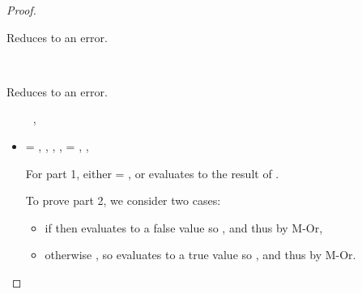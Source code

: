 \begin{lemma}
\begin{proof}
\begin{case}[BE-Assoc2]
  Reduces to an error.
\end{case}

\begin{case}[BE-Assoc3]
  \ 

  Reduces to an error.
\end{case}

\begin{case}[B-IfFalse]
        \opsem {\openv{}} {} {\false}
        \ \ \ \ 
        \opsem {\openv{}} {} {\nil},
        \opsem {\openv{}} {} {\val{}}

  \begin{itemize}
    \item[]
      \begin{subcase}[T-If]
        \ep{} = { {} {}},
        \judgementrewrite {\propenv{}} {\ep{1}} {} { {}}
                 {\object{1}}
                 {},
                 {} {\ty{}} { {}}
                 {\object{}}
                 {},
                 {} {\ty{}} { {}}
                 {\object{}}
                 {},
        \e{} = { {} {}},
  ,
  \inpropenv{\orprop {\elseprop {\prop{2}}} {\elseprop {\prop{3}}}}{\elseprop{\prop{}}}

              For part 1, either \object{} = \emptyobject{}, or \e{} evaluates to the
              result of \e{3}.

              To prove part 2, we consider two cases:
              \begin{itemize}
                \item if \isfalseval{\val{}}
                  then  evaluates to a false value so {}, and thus
                  {\satisfies{\openv{}}{\orprop {\elseprop {\prop{2}}} {\elseprop {\prop{3}}}}} by M-Or, 
                \item otherwise
                  \istrueval{\val{}},
                  so  evaluates to a true value so {}, and thus
                  {\satisfies{\openv{}}{\orprop {\thenprop {\prop{2}}} {\thenprop {\prop{3}}}}} by M-Or.
              \end{itemize}


\end{subcase}
\end{itemize}
\end{case}
\end{proof}
\end{lemma}
